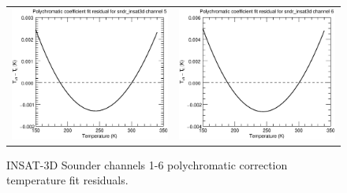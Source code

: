 \begin{figure}[H]
\begin{tabular}{c c}
    \includegraphics[scale=0.35]{graphics/sndr/tfit/sndr_insat3d-5.tfit.eps} &
    \includegraphics[scale=0.35]{graphics/sndr/tfit/sndr_insat3d-6.tfit.eps} \\
  \end{tabular}
  \caption{INSAT-3D Sounder channels 1-6 polychromatic correction temperature fit residuals.}
  \label{fig:sndr_ch1-6_tfit}
\end{figure}

